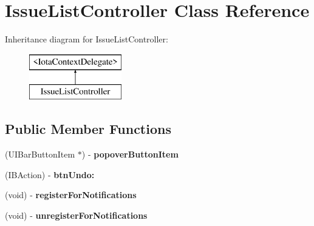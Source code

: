 \hypertarget{interface_issue_list_controller}{
\section{IssueListController Class Reference}
\label{interface_issue_list_controller}
}
Inheritance diagram for IssueListController:\begin{figure}[H]
\begin{center}
\leavevmode
\includegraphics[height=2.000000cm]{interface_issue_list_controller}
\end{center}
\end{figure}
\subsection*{Public Member Functions}
\begin{DoxyCompactItemize}
\item 
\hypertarget{interface_issue_list_controller_a3ed25450734c0b4e6ccac6c2f665dfc4}{
(UIBarButtonItem $\ast$) -\/ {\bfseries popoverButtonItem}}
\label{interface_issue_list_controller_a3ed25450734c0b4e6ccac6c2f665dfc4}

\item 
\hypertarget{interface_issue_list_controller_a927ae0207b958ccd7377fd51e035fbef}{
(IBAction) -\/ {\bfseries btnUndo:}}
\label{interface_issue_list_controller_a927ae0207b958ccd7377fd51e035fbef}

\item 
\hypertarget{interface_issue_list_controller_a8d43151c3575d6cce66aa2978452a9db}{
(void) -\/ {\bfseries registerForNotifications}}
\label{interface_issue_list_controller_a8d43151c3575d6cce66aa2978452a9db}

\item 
\hypertarget{interface_issue_list_controller_acbe5c369cb212f9b3f7f6b3e56d6b16e}{
(void) -\/ {\bfseries unregisterForNotifications}}
\label{interface_issue_list_controller_acbe5c369cb212f9b3f7f6b3e56d6b16e}

\end{DoxyCompactItemize}
